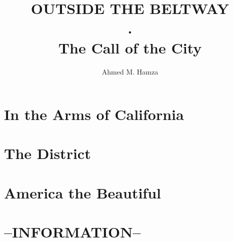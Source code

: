 \documentclass{book}
\begin{document}
\author{Ahmed M. Hamza}
\title{OUTSIDE THE BELTWAY\\.\\The Call of the City}

\maketitle

\tableofcontents

\part{In the Arms of California}


\part{The District}


\part{America the Beautiful}


\part{--INFORMATION--}
\end{document}
